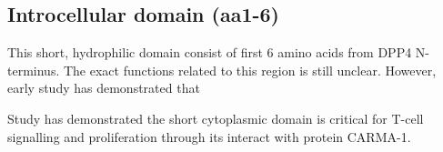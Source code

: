 \subsection{Introcellular domain (aa1-6)}

This short, hydrophilic domain consist of first 6 amino acids from DPP4 N-terminus. The exact functions related to this region is still unclear. However, early study has demonstrated that 

Study has demonstrated the short cytoplasmic domain is critical for T-cell signalling and proliferation through its interact with protein CARMA-1. \cite{Ohnuma_2007}